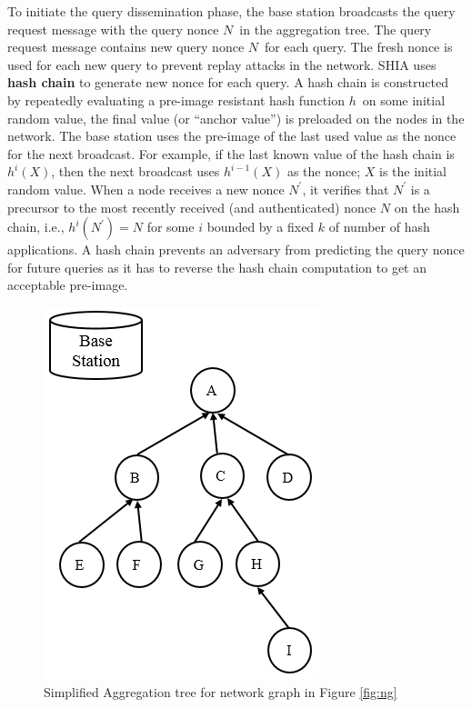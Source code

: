 	To initiate the query dissemination phase, the base station broadcasts the query request message with the query nonce $N$\ in the aggregation tree. 
	The query request message contains new query nonce $N$\ for each query.
	The fresh nonce is used for each new query to prevent replay attacks in the network.
	SHIA uses \textbf{hash chain} to generate new nonce for each query. 
	A hash chain is constructed by repeatedly evaluating a pre-image resistant hash function $h$\ on some initial random value, the final value (or ``anchor value'') is preloaded on the nodes in the network.
	The base station uses the pre-image of the last used  value as the nonce for the next broadcast.
	For example, if the last known value of the hash chain is $h^i(X)$, then the next broadcast uses $h^{i-1}(X)$ as the nonce; $X$ is the initial random value.
	When a node receives a new nonce $N^{'}$, it verifies that $N^{'}$ is a precursor to the most recently received (and authenticated) nonce $N$ on the hash chain, i.e., $h^{i}(N^{'}) = N$ for some $i$ bounded by a fixed $k$ of number of hash applications.  
	A hash chain prevents an adversary from predicting the query nonce for future queries as it has to reverse the hash chain computation to get an acceptable pre-image.
	\begin{figure}[h!]
		\centering
		\includegraphics[scale = 1]{images/aggregation-tree.png}
		\caption{Simplified Aggregation tree for network graph in Figure \ref{fig:ng}}
		\label{fig:at}
	\end{figure}		

